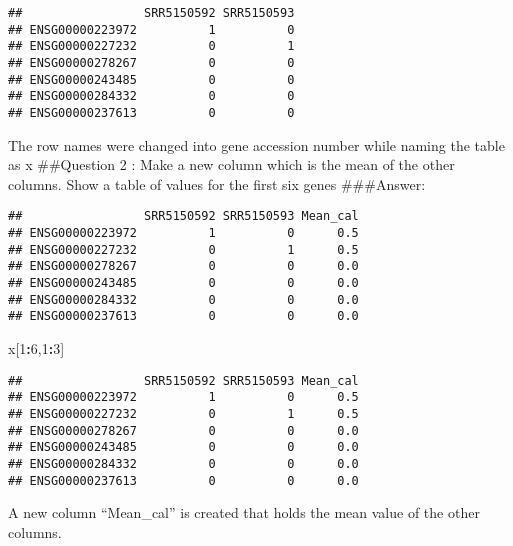 \documentclass[]{article}
\newenvironment{Shaded}{\begin{snugshade}}{\end{snugshade}}
\newcommand{\DecValTok}[1]{\textcolor[rgb]{0.00,0.00,0.81}{#1}}
\newcommand{\KeywordTok}[1]{\textcolor[rgb]{0.13,0.29,0.53}{\textbf{#1}}}
\newcommand{\NormalTok}[1]{#1}
\newcommand{\OperatorTok}[1]{\textcolor[rgb]{0.81,0.36,0.00}{\textbf{#1}}}
\newcommand{\StringTok}[1]{\textcolor[rgb]{0.31,0.60,0.02}{#1}}
\begin{document}
\begin{verbatim}
##                 SRR5150592 SRR5150593
## ENSG00000223972          1          0
## ENSG00000227232          0          1
## ENSG00000278267          0          0
## ENSG00000243485          0          0
## ENSG00000284332          0          0
## ENSG00000237613          0          0
\end{verbatim}

The row names were changed into gene accession number while naming the
table as x \#\#Question 2 : Make a new column which is the mean of the
other columns. Show a table of values for the first six genes
\#\#\#Answer:

\begin{Shaded}
\end{Shaded}

\begin{verbatim}
##                 SRR5150592 SRR5150593 Mean_cal
## ENSG00000223972          1          0      0.5
## ENSG00000227232          0          1      0.5
## ENSG00000278267          0          0      0.0
## ENSG00000243485          0          0      0.0
## ENSG00000284332          0          0      0.0
## ENSG00000237613          0          0      0.0
\end{verbatim}

\begin{Shaded}
\begin{Highlighting}[]
\NormalTok{x[}\DecValTok{1}\OperatorTok{:}\DecValTok{6}\NormalTok{,}\DecValTok{1}\OperatorTok{:}\DecValTok{3}\NormalTok{]}
\end{Highlighting}
\end{Shaded}

\begin{verbatim}
##                 SRR5150592 SRR5150593 Mean_cal
## ENSG00000223972          1          0      0.5
## ENSG00000227232          0          1      0.5
## ENSG00000278267          0          0      0.0
## ENSG00000243485          0          0      0.0
## ENSG00000284332          0          0      0.0
## ENSG00000237613          0          0      0.0
\end{verbatim}

A new column ``Mean\_cal'' is created that holds the mean value of the
other columns.
\end{document}
